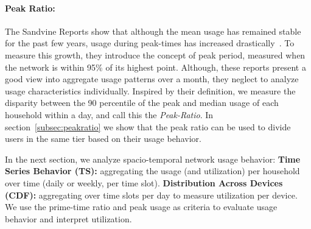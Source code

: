 \paragraph{Peak Ratio: }The Sandvine Reports show that although the mean usage has remained
stable for the past few years, usage during peak-times has increased
drastically~\cite{sandvine20141h}. To measure this growth, they introduce the
concept of peak period, measured when the network is within 95\% of its highest point.
Although, these reports present a good view into aggregate usage patterns over a month,
they neglect to analyze usage characteristics individually. Inspired by their
definition, we measure the disparity between the 90 percentile of the peak and median
usage of each household within a day, and call this the \emph{Peak-Ratio}. In
section~\ref{subsec:peakratio} we show that the peak ratio can be used
to divide users in the same tier based on their usage behavior.

In the next section, we analyze spacio-temporal network usage behavior:
\textbf{Time Series Behavior (TS): }aggregating the usage (and utilization) per household
over time (daily or weekly, per time slot). \textbf{Distribution Across Devices (CDF): }aggregating over time slots per day to measure utilization per device. We use the prime-time ratio and peak usage
as criteria to evaluate usage behavior and interpret utilization.



